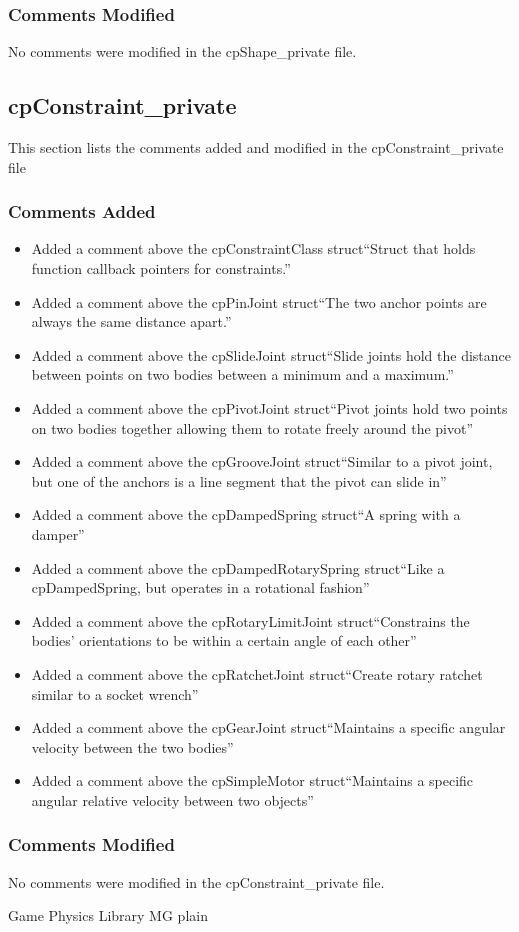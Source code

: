 \documentclass[12pt]{article}
\begin{document}
\subsubsection{Comments Modified}
No comments were modified in the cpShape\_private file.




\subsection{cpConstraint\_private} 
This section lists the comments added and modified  in the cpConstraint\_private file

\subsubsection{Comments Added}
\begin{itemize}
\item Added a comment above the cpConstraintClass  struct``Struct that holds function callback pointers for constraints.''
\item Added a comment above the cpPinJoint  struct``The two anchor points are always the same distance apart.''
\item Added a comment above the cpSlideJoint  struct``Slide joints hold the distance between points on two bodies between a minimum and a maximum.''
\item Added a comment above the cpPivotJoint  struct``Pivot joints hold two points on two bodies together allowing them to rotate freely around the pivot''
\item Added a comment above the cpGrooveJoint  struct``Similar to a pivot joint, but one of the anchors is a line segment that the pivot can slide in''
\item Added a comment above the cpDampedSpring  struct``A spring with a damper''
\item Added a comment above the cpDampedRotarySpring  struct``Like a cpDampedSpring, but operates in a rotational fashion''
\item Added a comment above the cpRotaryLimitJoint  struct``Constrains the bodies' orientations to be within a certain angle of each other''
\item Added a comment above the cpRatchetJoint  struct``Create rotary ratchet similar to a socket wrench''
\item Added a comment above the cpGearJoint  struct``Maintains a specific angular velocity between the two bodies''
\item Added a comment above the cpSimpleMotor  struct``Maintains a specific angular relative velocity between two objects''
\end{itemize}

\subsubsection{Comments Modified}
No comments were modified in the cpConstraint\_private file.

 {Game Physics Library MG}{}
 {plain}
\end{document}
